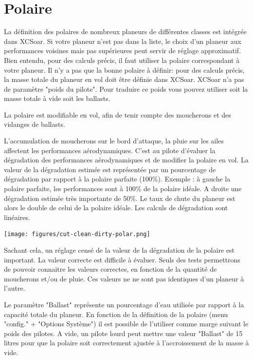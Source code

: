 \section{Polaire}
La définition des polaires de nombreux planeurs de différentes classes est intégrée dans XCSoar. Si votre planeur n'est pas dans la liste, le choix d'un planeur aux performances voisines mais pas supérieures peut servir de réglage approximatif. Bien entendu, pour des calculs précis, il faut utiliser la polaire correspondant à votre planeur. Il n'y a pas que la bonne polaire à définir: pour des calculs précis, la masse totale du planeur en vol doit être définie dans XCSoar. XCSoar n'a pas de paramètre "poids du pilote". Pour traduire ce poids vous pouvez utiliser soit la masse totale à vide soit les ballasts.

La polaire est modifiable en vol, afin de tenir compte des moucherons et des vidanges de ballasts.

L'accumulation de moucherons sur le bord d'attaque, la pluie sur les ailes affectent les performances aérodynamiques. C'est au pilote d'évaluer la dégradation des performances aérodynamiques et de modifier la polaire en vol. La valeur de la dégradation estimée est représentée par un pourcentage de dégradation par rapport à la polaire parfaite (100\%). Exemple : à gauche la polaire parfaite, les performances sont à 100\% de la polaire idéale. A droite une dégradation estimée très importante de 50\%. Le taux de chute du planeur est alors le double de celui de la polaire idéale. Les calculs de dégradation sont linéaires.

\begin{center}
\texttt{[image: figures/cut-clean-dirty-polar.png]}
\end{center}
Sachant cela, un réglage censé de la valeur de la dégradation de la polaire est important. La valeur correcte est difficile à évaluer. Seuls des tests permettrons de pouvoir connaitre les valeurs correctes, en fonction de la quantité de moucherons et/ou de pluie. Ces valeurs ne ne sont pas identiques d'un planeur à l'autre.

Le paramètre "Ballast" représente un pourcentage d'eau utilisée par rapport à la capacité totale du planeur. En fonction de la définition de la polaire (menu "config." + "Options Système") il est possible de l'utiliser comme marge suivant le poids des pilotes. A vide, un pilote lourd peut mettre une valeur "Ballast" de 15 litres pour que la polaire soit correctement ajustée à l'accroissement de la masse à vide.


